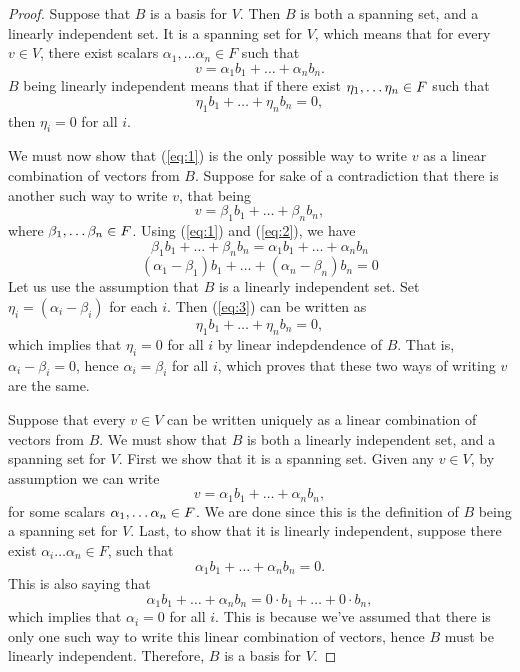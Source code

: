 \documentclass[11pt]{article}
\begin{document}
\begin{proof}
\necessary Suppose that $ B $ is a basis for $ V $. Then $ B $ is both a spanning set, and a linearly independent set. It is a spanning set for $ V $, which means that for every $ v \in V $, there exist scalars $ \alpha_{1}, \dots \alpha_{n} \in F $ such that 
\begin{equation} \label{eq:1}
	v = \alpha_{1} b_{1} + \dots + \alpha_{n} b_{n}.
\end{equation}
$ B $ being linearly independent means that if there exist $ \eta_{1}, \dots \eta_{n} \in F $ such that
\[ \eta_{1} b_{1} + \dots + \eta_{n} b_{n} = 0, \]
then  $ \eta_{i} = 0 $ for all $ i $.

We must now show that (\ref{eq:1}) is the only possible way to write $ v $ as a linear combination of vectors from $ B $. Suppose for sake of a contradiction that there is another such way to write $ v $, that being
\begin{equation} \label{eq:2}
	v = \beta_{1} b_{1} + \dots + \beta_{n} b_{n},	
\end{equation}
where $ \beta_{1}, \dots \beta_{n} \in F $. Using (\ref{eq:1}) and (\ref{eq:2}), we have
\[ \beta_{1} b_{1} + \dots + \beta_{n} b_{n} = \alpha_{1} b_{1} + \dots + \alpha_{n} b_{n} \]
\begin{equation} \label{eq:3}
	(\alpha_{1} - \beta_{1}) b_{1} + \dots + (\alpha_{n} - \beta_{n}) b_{n} = 0 
\end{equation}
Let us use the assumption that $ B $ is a linearly independent set. Set $ \eta_{i} = (\alpha_{i}-  \beta_{i}) $ for each $ i $. Then (\ref{eq:3}) can be written as 
\[ \eta_{1} b_{1} +  \dots + \eta_{n} b_{n} = 0, \]
which implies that $ \eta_{i} = 0 $ for all $ i $ by linear indepdendence of $ B $. That is, $ \alpha_{i} - \beta_{i} = 0 $, hence $ \alpha_{i} = \beta_{i} $ for all $ i $, which proves that these two ways of writing $ v $ are the same.

\sufficient Suppose that every $ v \in V $ can be written uniquely as a linear combination of vectors from $ B $. We must show that $ B $ is both a linearly independent set, and a spanning set for $ V $. First we show that it is a spanning set. Given any $ v \in V $, by assumption we can write 
\[ v = \alpha_{1}b_{1} + \dots + \alpha_{n} b_{n}, \] 
for some scalars $ \alpha_{1}, \dots \alpha_{n} \in F $. We are done since this is the definition of $ B $ being a spanning set for $ V $. Last, to show that it is linearly independent, suppose there exist $ \alpha_{i} \dots \alpha_{n} \in F $, such that 
\[ \alpha_{1} b_{1} + \dots + \alpha_{n}b_{n} = 0. \]
This is also saying that 
\[ \alpha_{1} b_{1} + \dots + \alpha_{n}b_{n} = 0 \cdot b_{1} + \dots + 0 \cdot b_{n}, \]
which implies that $ \alpha_{i} = 0 $ for all $ i $. This is because we've assumed that there is only one such way to write this linear combination of vectors, hence $ B $ must be linearly independent. Therefore, $ B $ is a basis for $ V $.
\end{proof}
\end{document}

